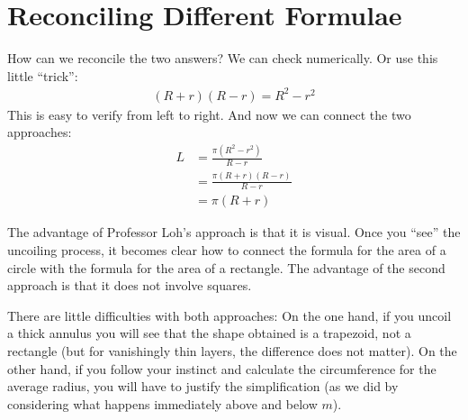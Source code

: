 \documentclass[12pt]{article}
\begin{document}
\newpage 
\section*{Reconciling Different Formulae}
How can we reconcile the two answers? We can check numerically. Or use this little ``trick'':
\begin{align*}
(R+r)(R-r) = R^{2}-r^{2}
\end{align*}
This is easy to verify from left to right. And now we can connect the two approaches:
\begin{align*}
L & = \frac{\pi(R^{2}-r^{2})}{R-r} \\
  & = \frac{\pi(R+r)(R-r)}{R-r} \\
  & = \pi (R+r)
\end{align*}

The advantage of Professor Loh's approach is that it is visual. Once you ``see'' the uncoiling process, it becomes clear how to connect the formula for the area of a circle with the formula for the area of a rectangle. The advantage of the second approach is that it does not involve squares. 

There are little difficulties with both approaches: On the one hand, if you uncoil a thick annulus you will see that the shape obtained is a trapezoid, not a rectangle (but for vanishingly thin layers, the difference does not matter). On the other hand, if you follow your instinct and calculate the circumference for the average radius, you will have to justify the simplification (as we did by considering what happens immediately above and below $m$). 
\end{document}

